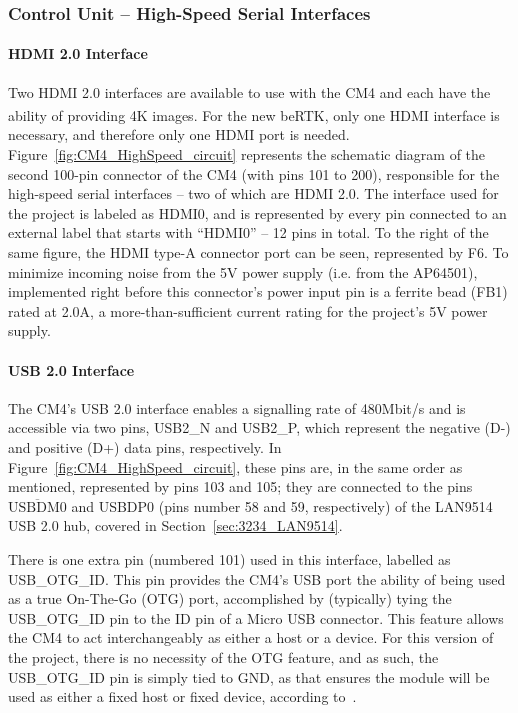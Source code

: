 
\subsubsection{Control Unit -- High-Speed Serial Interfaces}\label{sec:3221_CM4_HSpeed}

\paragraph{HDMI 2.0 Interface}	Two HDMI 2.0 interfaces are available to use with the CM4 and each have the ability of providing 4K images. For the new beRTK\textsuperscript{\textregistered}, only one HDMI interface is necessary, and therefore only one HDMI port is needed. Figure~\ref{fig:CM4_HighSpeed_circuit} represents the schematic diagram of the second 100-pin connector of the CM4 (with pins 101 to 200), responsible for the high-speed serial interfaces -- two of which are HDMI 2.0. The interface used for the project is labeled as HDMI0, and is represented by every pin connected to an external label that starts with ``HDMI0'' -- 12 pins in total. To the right of the same figure, the HDMI type-A connector port can be seen, represented by F6. To minimize incoming noise from the 5V power supply (i.e. from the AP64501), implemented right before this connector's power input pin is a ferrite bead (FB1) rated at 2.0A, a more-than-sufficient current rating for the project's 5V power supply.

\paragraph{USB 2.0 Interface}	The CM4's USB 2.0 interface enables a signalling rate of 480Mbit/s and is accessible via two pins, USB2\_N and USB2\_P, which represent the negative (D-) and positive (D+) data pins, respectively. In Figure~\ref{fig:CM4_HighSpeed_circuit}, these pins are, in the same order as mentioned, represented by pins 103 and 105; they are connected to the pins $\overline{\mbox{USBDM0}}$ and USBDP0 (pins number 58 and 59, respectively) of the LAN9514 USB 2.0 hub, covered in Section~\ref{sec:3234_LAN9514}.

There is one extra pin (numbered 101) used in this interface, labelled as USB\_OTG\_ID. This pin  provides the CM4's USB port the ability of being used as a true On-The-Go (OTG) port, accomplished by (typically) tying the USB\_OTG\_ID pin to the ID pin of a Micro USB connector. This feature allows the CM4 to act interchangeably as either a host or a device. For this version of the project, there is no necessity of the OTG feature, and as such, the USB\_OTG\_ID pin is simply tied to GND, as that ensures the module will be used as either a fixed host or fixed device, according to~\cite{CM4}.

